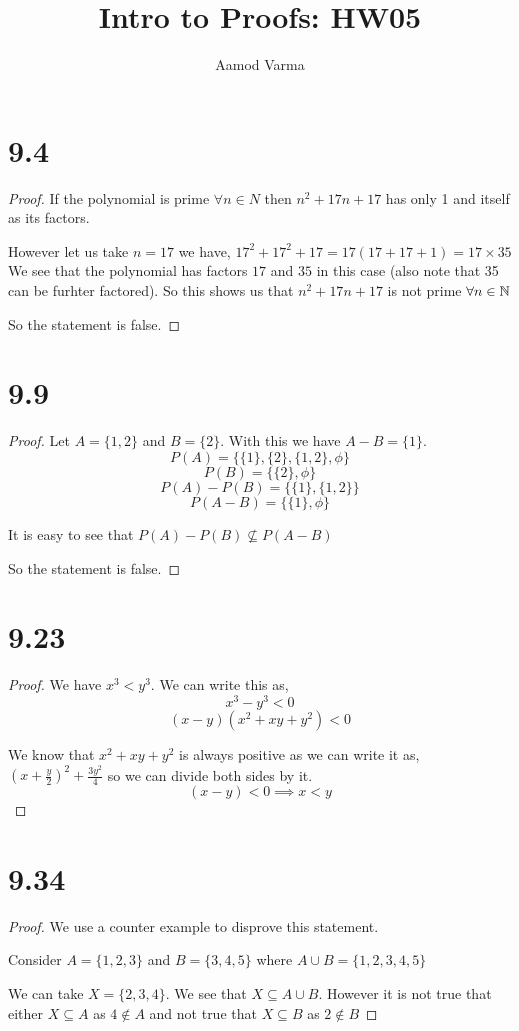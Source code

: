 \documentclass[a4paper]{report}
\title{Intro to Proofs: HW05}
\author{Aamod Varma}
\begin{document}
\maketitle
\date{}
    
\section*{9.4}
\begin{proof}

    If the polynomial is prime $\forall n \in N$  then $n^2 + 17n + 17$ has only 1 and itself as its factors.

    However let us take $n = 17$ we have, $17^2 + 17^2 + 17 = 17 (17 + 17 + 1) = 17 \times  35$
    We see that the polynomial has factors $17$ and $35$ in this case (also note that 35 can be furhter factored). So this shows us that $n^2 + 17n + 17$ is not prime $\forall n \in \mathbb{N}$

    So the statement is false.
\end{proof}


\section*{9.9}
\begin{proof}
    Let $A = \{1,2\}$ and $B = \{2\}$. With this we have  $A - B = \{1\}$. 
    $$ P(A) = \{ \{1\}, \{2\},\{1,2\}, \phi \}$$ 
    $$ P(B) = \{ \{2\}, \phi \}$$ 
    $$ P(A) - P(B) = \{ \{1\}, \{1,2\} \}$$ 
    $$ P(A - B) = \{ \{1\}, \phi \}$$ 

    It is easy to see that $P(A) - P(B) \not \subseteq P(A - B)$

    So the statement is false.
\end{proof}

\section*{9.23}
\begin{proof}
    We have $x^3 < y^{3} $. We can write this as, 
    $$ x^3 - y^3 < 0 $$ 
    $$ (x - y)(x^2 + xy + y^2) < 0 $$ 

    We know that $x^2 + xy + y^2$ is always positive as we can write it as, $(x + \frac{y}{2})^2 + \frac{3y^2}{4}$ so we can divide both sides by it.
    $$ (x - y) < 0 \implies x < y$$ 
\end{proof}


\section*{9.34}
\begin{proof}
    We use a counter example to disprove this statement.

    Consider $A = \{1,2,3\}$ and  $B = \{3,4, 5\}$ where $A \cup B = \{1,2,3,4,5\}$

    We can take $X = \{2,3,4\}$. We see that  $X \subseteq A \cup B$. However it is not true that either $X \subseteq A$ as  $4 \not \in A$ and not true that  $X \subseteq B$ as  $2 \not \in B$

\end{proof}
\end{document}
